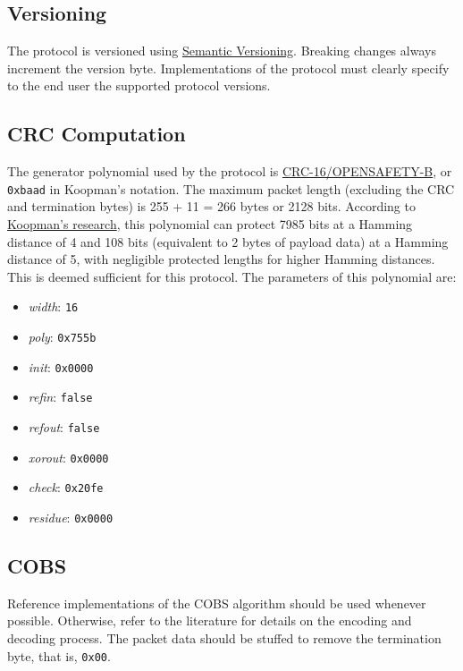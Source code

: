 \documentclass[a4paper,11pt,english]{article}
\begin{document}
\subsection{Versioning}

The protocol is versioned using \href{https://semver.org/}{Semantic Versioning}. Breaking changes always increment the version byte. Implementations of the protocol must clearly specify to the end user the supported protocol versions.

\subsection{CRC Computation}

The generator polynomial used by the protocol is \href{https://reveng.sourceforge.io/crc-catalogue/all.htm#crc.cat.crc-16-opensafety-b}{CRC-16/OPENSAFETY-B}, or \texttt{0xbaad} in Koopman's notation. The maximum packet length (excluding the CRC and termination bytes) is 255 + 11 = 266 bytes or 2128 bits. According to \href{https://users.ece.cmu.edu/~koopman/crc/c16/0xbaad_len.txt}{Koopman's research}, this polynomial can protect 7985 bits at a Hamming distance of 4 and 108 bits (equivalent to 2 bytes of payload data) at a Hamming distance of 5, with negligible protected lengths for higher Hamming distances. This is deemed sufficient for this protocol. The parameters of this polynomial are:

\begin{itemize}
  \item \textit{width}: \texttt{16}
  \item \textit{poly}: \texttt{0x755b}
  \item \textit{init}: \texttt{0x0000}
  \item \textit{refin}: \texttt{false}
  \item \textit{refout}: \texttt{false}
  \item \textit{xorout}: \texttt{0x0000}
  \item \textit{check}: \texttt{0x20fe}
  \item \textit{residue}: \texttt{0x0000}
\end{itemize}

\subsection{COBS}
Reference implementations of the COBS algorithm should be used whenever possible. Otherwise, refer to the literature for details on the encoding and decoding process. The packet data should be stuffed to remove the termination byte, that is, \texttt{0x00}.
\end{document}
